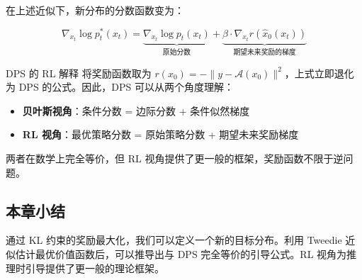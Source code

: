 在上述近似下，新分布的分数函数变为：

$$\nabla_{x_t} \log p_t^*(x_t) = \underbrace{\nabla_{x_t} \log p_t(x_t)}_{\text{原始分数}} + \underbrace{\beta \cdot \nabla_{x_t} r(\hat{x}_0(x_t))}_{\text{期望未来奖励的梯度}}$$

\begin{importantbox}{DPS 的 RL 解释}
将奖励函数取为 $r(x_0) = -\| y - \mathcal{A}(x_0) \|^2$，上式立即退化为 DPS 的公式。因此，DPS 可以从两个角度理解：
\begin{itemize}
    \item \textbf{贝叶斯视角}：条件分数 = 边际分数 + 条件似然梯度
    \item \textbf{RL 视角}：最优策略分数 = 原始策略分数 + 期望未来奖励梯度
\end{itemize}
两者在数学上完全等价，但 RL 视角提供了更一般的框架，奖励函数不限于逆问题。
\end{importantbox}

\subsection{本章小结}

通过 KL 约束的奖励最大化，我们可以定义一个新的目标分布。利用 Tweedie 近似估计最优价值函数后，可以推导出与 DPS 完全等价的引导公式。RL 视角为推理时引导提供了更一般的理论框架。

